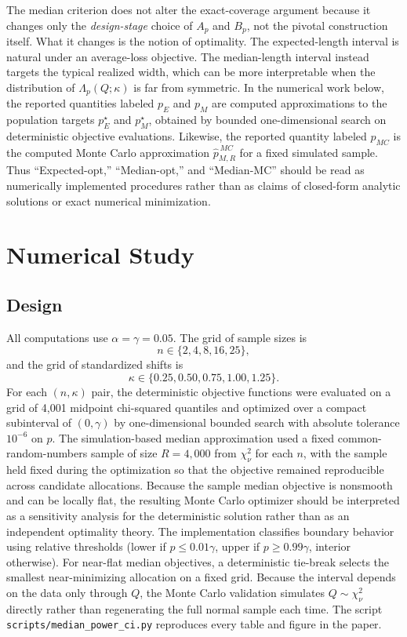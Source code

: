 \documentclass[11pt]{article}
\begin{document}
The median criterion does not alter the exact-coverage argument because it changes only the \emph{design-stage} choice of $A_p$ and $B_p$, not the pivotal construction itself. What it changes is the notion of optimality. The expected-length interval is natural under an average-loss objective. The median-length interval instead targets the typical realized width, which can be more interpretable when the distribution of $\Lambda_p(Q;\kappa)$ is far from symmetric. In the numerical work below, the reported quantities labeled $p_E$ and $p_M$ are computed approximations to the population targets $p_E^\star$ and $p_M^\star$, obtained by bounded one-dimensional search on deterministic objective evaluations. Likewise, the reported quantity labeled $p_{MC}$ is the computed Monte Carlo approximation $\widehat p_{M,R}^{\,MC}$ for a fixed simulated sample. Thus ``Expected-opt,'' ``Median-opt,'' and ``Median-MC'' should be read as numerically implemented procedures rather than as claims of closed-form analytic solutions or exact numerical minimization.

\section{Numerical Study}
\subsection{Design}
All computations use $\alpha=\gamma=0.05$. The grid of sample sizes is
\[
n\in\{2,4,8,16,25\},
\]
and the grid of standardized shifts is
\[
\kappa\in\{0.25,0.50,0.75,1.00,1.25\}.
\]
For each $(n,\kappa)$ pair, the deterministic objective functions were evaluated on a grid of 4{,}001 midpoint chi-squared quantiles and optimized over a compact subinterval of $(0,\gamma)$ by one-dimensional bounded search with absolute tolerance $10^{-6}$ on $p$. The simulation-based median approximation used a fixed common-random-numbers sample of size $R=4{,}000$ from $\chi^2_\nu$ for each $n$, with the sample held fixed during the optimization so that the objective remained reproducible across candidate allocations. Because the sample median objective is nonsmooth and can be locally flat, the resulting Monte Carlo optimizer should be interpreted as a sensitivity analysis for the deterministic solution rather than as an independent optimality theory. The implementation classifies boundary behavior using relative thresholds (lower if $p\le 0.01\gamma$, upper if $p\ge 0.99\gamma$, interior otherwise). For near-flat median objectives, a deterministic tie-break selects the smallest near-minimizing allocation on a fixed grid. Because the interval depends on the data only through $Q$, the Monte Carlo validation simulates $Q\sim\chi^2_\nu$ directly rather than regenerating the full normal sample each time. The script \texttt{scripts/median\_power\_ci.py} reproduces every table and figure in the paper.
\end{document}
